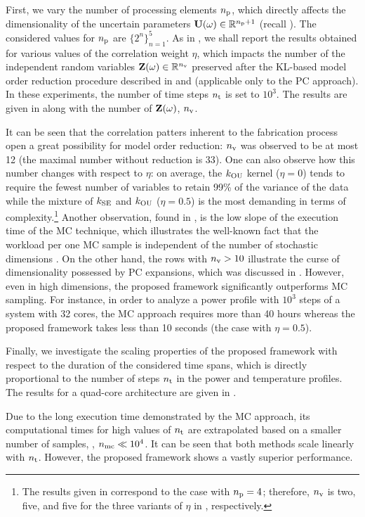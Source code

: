 First, we vary the number of processing elements ${n_\text{p}}$, which directly affects the dimensionality of the uncertain parameters $\mathbf{U}(\omega) \in \mathbb{R}^{{n_\text{p}} + 1}$ (recall ).
The considered values for ${n_\text{p}}$ are $\{ 2^n \}_{n = 1}^5$.
As in , we shall report the results obtained for various values of the correlation weight $\eta$, which impacts the number of the independent random variables $\mathbf{Z}(\omega) \in \mathbb{R}^{n_\text{v}}$ preserved after the KL-based model order reduction procedure described in  and  (applicable only to the PC approach).
In these experiments, the number of time steps ${n_\text{t}}$ is set to $10^3$.
The results are given in  along with the number of $\mathbf{Z}(\omega)$, ${n_\text{v}}$.

It can be seen that the correlation patters inherent to the fabrication process \cite{cheng2011} open a great possibility for model order reduction: ${n_\text{v}}$ was observed to be at most 12 (the maximal number without reduction is 33).
One can also observe how this number changes with respect to $\eta$: on average, the $\fCorr_\OU$ kernel ($\eta = 0$) tends to require the fewest number of variables to retain 99\% of the variance of the data while the mixture of $\fCorr_\SE$ and $\fCorr_\OU$ ($\eta = 0.5$) is the most demanding in terms of complexity.\footnote{The results given in  correspond to the case with ${n_\text{p}} = 4$; therefore, ${n_\text{v}}$ is two, five, and five for the three variants of $\eta$ in , respectively.}
Another observation, found in , is the low slope of the execution time of the MC technique, which illustrates the well-known fact that the workload per one MC sample is independent of the number of stochastic dimensions \cite{maitre2010}.
On the other hand, the rows with ${n_\text{v}} > 10$ illustrate the curse of dimensionality possessed by PC expansions, which was discussed in .
However, even in high dimensions, the proposed framework significantly outperforms MC sampling. For instance, in order to analyze a power profile with $10^3$ steps of a system with 32 cores, the MC approach requires more than 40 hours whereas the proposed framework takes less than 10 seconds (the case with $\eta = 0.5$).

Finally, we investigate the scaling properties of the proposed framework with respect to the duration of the considered time spans, which is directly proportional to the number of steps ${n_\text{t}}$ in the power and temperature profiles.
The results for a quad-core architecture are given in .

Due to the long execution time demonstrated by the MC approach, its computational times for high values of ${n_\text{t}}$ are extrapolated based on a smaller number of samples, \ie, ${n_\text{mc}} \ll 10^4$.
It can be seen that both methods scale linearly with ${n_\text{t}}$. However, the proposed framework shows a vastly superior performance.

